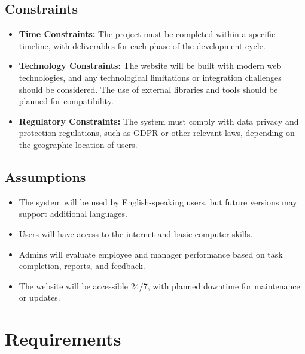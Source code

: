 \documentclass[a4paper,12pt]{article}
\begin{document}
\subsection{Constraints}
\begin{itemize}
    \item \textbf{Time Constraints:} The project must be completed within a specific timeline, with deliverables for each phase of the development cycle.
    \item \textbf{Technology Constraints:} The website will be built with modern web technologies, and any technological limitations or integration challenges should be considered. The use of external libraries and tools should be planned for compatibility.
    \item \textbf{Regulatory Constraints:} The system must comply with data privacy and protection regulations, such as GDPR or other relevant laws, depending on the geographic location of users.
\end{itemize}

\subsection{Assumptions}
\begin{itemize}
    \item The system will be used by English-speaking users, but future versions may support additional languages.
    \item Users will have access to the internet and basic computer skills.
    \item Admins will evaluate employee and manager performance based on task completion, reports, and feedback.
    \item The website will be accessible 24/7, with planned downtime for maintenance or updates.
\end{itemize}

\newpage

\section{Requirements}
\end{document}
